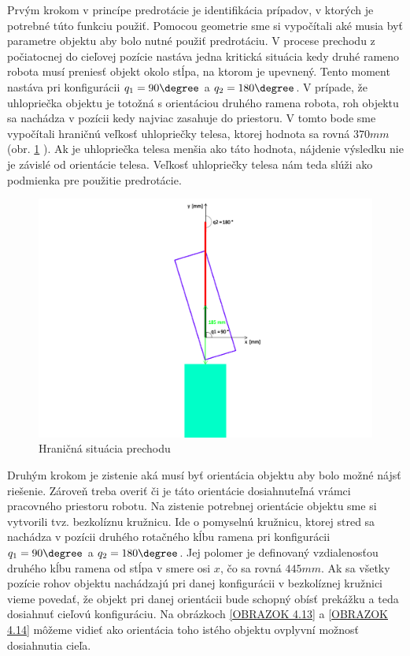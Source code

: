 Prvým krokom v princípe predrotácie je identifikácia prípadov, v ktorých je potrebné túto funkciu použiť. Pomocou geometrie sme si vypočítali aké musia byť parametre objektu aby bolo nutné použiť predrotáciu. V procese prechodu z počiatocnej do cieľovej pozície nastáva jedna kritická situácia kedy druhé rameno robota musí preniesť objekt okolo stĺpa, na ktorom je upevnený. Tento moment nastáva pri konfigurácii $ q_1 = 90 \degree $ a $ q_2 = 180 \degree $. V prípade, že uhlopriečka objektu je totožná s orientáciou druhého ramena robota, roh objektu sa nachádza v pozícii kedy najviac zasahuje do priestoru. V tomto bode sme vypočítali hraničnú veľkosť uhlopriečky telesa, ktorej hodnota sa rovná $ 370 mm $ (obr. \ref{OBRAZOK 4.12} ). Ak je uhlopriečka telesa menšia ako táto hodnota, nájdenie výsledku nie je závislé od orientácie telesa. Veľkosť uhlopriečky telesa nám teda slúži ako podmienka pre použitie predrotácie.

\begin{figure}[h]
	\centering
	\includegraphics[width=160mm]{img/PREROT-uhlopriecka.pdf}
	\caption{ Hraničná situácia prechodu} \label{OBRAZOK 4.12} 
\end{figure} 

Druhým krokom je zistenie aká musí byť orientácia objektu aby bolo možné nájsť riešenie. Zároveň treba overiť či je táto orientácie dosiahnuteľná vrámci pracovného priestoru robotu.  
Na zistenie potrebnej orientácie objektu sme si vytvorili tvz. bezkolíznu kružnicu. Ide o pomyselnú kružnicu, ktorej stred sa nachádza v pozícii druhého rotačného kĺbu ramena pri konfigurácii  $ q_1 = 90 \degree $ a $ q_2 = 180 \degree $. Jej polomer je definovaný vzdialenosťou druhého kĺbu ramena od stĺpa v smere osi $ x $, čo sa rovná $ 445 mm $.  Ak sa všetky pozície rohov objektu nachádzajú pri danej konfigurácii v bezkolíznej kružnici vieme povedať, že objekt pri danej orientácii bude schopný obísť prekážku a teda dosiahnuť cieľovú konfiguráciu. Na obrázkoch \ref{OBRAZOK 4.13}  a \ref{OBRAZOK 4.14} môžeme vidieť ako orientácia toho istého objektu ovplyvní možnosť dosiahnutia cieľa. 


